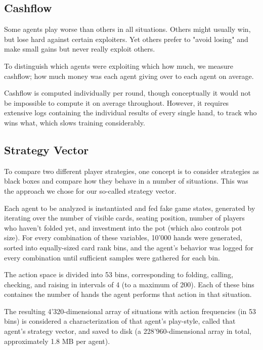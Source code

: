 \subsection{Cashflow}

Some agents play worse than others in all situations. Others might usually win, but lose hard against certain exploiters. Yet others prefer to "avoid losing" and make small gains but never really exploit others.

To distinguish which agents were exploiting which how much, we measure cashflow; how much money was each agent giving over to each agent on average.


Cashflow is computed individually per round, though conceptually it would not be impossible to compute it on average throughout. However, it requires extensive logs containing the individual results of every single hand, to track who wins what, which slows training considerably.


\subsection{Strategy Vector}
\label{StrategyVectorComputation}
To compare two different player strategies, one concept is to consider strategies as black boxes and compare how they behave in a number of situations. This was the approach we chose for our so-called strategy vector.

Each agent to be analyzed is instantiated and fed fake game states, generated by iterating over the number of visible cards, seating position, number of players who haven't folded yet, and investment into the pot (which also controls pot size). For every combination of these variables, 10'000 hands were generated, sorted into equally-sized card rank bins, and the agent's behavior was logged for every combination until sufficient samples were gathered for each bin.

The action space is divided into 53 bins, corresponding to folding, calling, checking, and raising in intervals of 4 (to a maximum of 200). Each of these bins containes the number of hands the agent performs that action in that situation.

The resulting 4'320-dimensional array of situations with action frequencies (in 53 bins) is considered a characterization of that agent's play-style, called that agent's strategy vector, and saved to disk (a 228'960-dimensional array in total, approximately 1.8 MB per agent).

